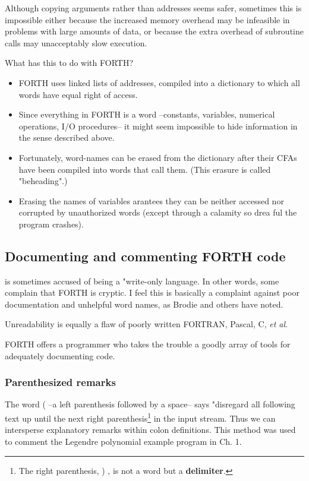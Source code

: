 Although copying arguments rather than addresses seems safer, sometimes this is impossible either because the increased memory overhead may be infeasible in problems with large amounts of data, or because the extra overhead of subroutine calls may unacceptably slow execution.

What has this to do with FORTH?

\begin{itemize}
    \item FORTH uses linked lists of addresses, compiled into a dictionary to which all words have equal right of access.
    \item Since everything in FORTH is a word --constants, variables, numerical operations, I/O procedures-- it might seem impossible to hide information in the sense described above.
    \item Fortunately, word-names can be erased from the dictionary after their CFAs have been compiled into words that call them. (This erasure is called "beheading".)
    \item Erasing the names of variables arantees they can be neither accessed nor corrupted by unauthorized words (except through a calamity so drea ful the program crashes).
\end{itemize}

\subsection{Documenting and commenting FORTH code}

 is sometimes accused of being a "write-only language. In other words, some complain that FORTH is cryptic. I feel this is basically a complaint against poor documentation and unhelpful word names, as Brodie and others have noted.

Unreadability is equally a flaw of poorly written FORTRAN, Pascal, C, \textit{et al}.

FORTH offers a programmer who takes the trouble a goodly array of tools for adequately documenting code.

\subsubsection{Parenthesized remarks}
The word ( --a left parenthesis followed by a space-- says "disregard all following text up until the next right parenthesis\footnote{The right parenthesis, ) , is not a word but a \textbf{delimiter}.} in the input stream. Thus we can intersperse explanatory remarks within colon definitions. This method was used to comment the Legendre polynomial example program in Ch. 1.

